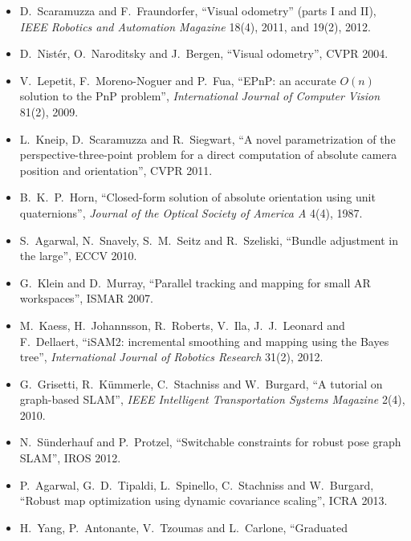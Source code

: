\begin{description}[leftmargin=1.5em,style=nextline,font=\normalfont]
\item[Visual odometry and PnP]
\begin{itemize}[nosep]
\item D.~Scaramuzza and F.~Fraundorfer, ``Visual odometry'' (parts I and
  II), \emph{IEEE Robotics and Automation Magazine} 18(4), 2011, and
  19(2), 2012.
\item D.~Nist\'er, O.~Naroditsky and J.~Bergen, ``Visual odometry'',
  CVPR 2004.
\item V.~Lepetit, F.~Moreno-Noguer and P.~Fua, ``EPnP: an accurate
  $O(n)$ solution to the PnP problem'', \emph{International Journal of
  Computer Vision} 81(2), 2009.
\item L.~Kneip, D.~Scaramuzza and R.~Siegwart, ``A novel parametrization
  of the perspective-three-point problem for a direct computation of
  absolute camera position and orientation'', CVPR 2011.
\item B.~K.~P.~Horn, ``Closed-form solution of absolute orientation using
  unit quaternions'', \emph{Journal of the Optical Society of America A}
  4(4), 1987.
\end{itemize}
\item[Bundle adjustment]
\begin{itemize}[nosep]
\item S.~Agarwal, N.~Snavely, S.~M.~Seitz and R.~Szeliski, ``Bundle
  adjustment in the large'', ECCV 2010.
\item G.~Klein and D.~Murray, ``Parallel tracking and mapping for small
  AR workspaces'', ISMAR 2007.
\end{itemize}
\item[Pose graphs and incremental smoothing]
\begin{itemize}[nosep]
\item M.~Kaess, H.~Johannsson, R.~Roberts, V.~Ila, J.~J.~Leonard and
  F.~Dellaert, ``iSAM2: incremental smoothing and mapping using the Bayes
  tree'', \emph{International Journal of Robotics Research} 31(2), 2012.
\item G.~Grisetti, R.~K\"ummerle, C.~Stachniss and W.~Burgard, ``A
  tutorial on graph-based SLAM'', \emph{IEEE Intelligent Transportation
  Systems Magazine} 2(4), 2010.
\item N.~S\"underhauf and P.~Protzel, ``Switchable constraints for robust
  pose graph SLAM'', IROS 2012.
\item P.~Agarwal, G.~D.~Tipaldi, L.~Spinello, C.~Stachniss and W.~Burgard,
  ``Robust map optimization using dynamic covariance scaling'', ICRA 2013.
\item H.~Yang, P.~Antonante, V.~Tzoumas and L.~Carlone, ``Graduated

\end{itemize}
\end{description}
